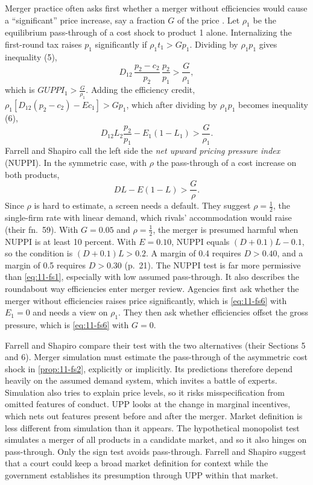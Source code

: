  Merger practice often asks first whether a merger without efficiencies would
cause a ``significant'' price increase, say a fraction $G$ of the price \citep[Section 3.C]{FarrellShapiro2010}. Let
$\rho_1$ be the equilibrium pass-through of a cost shock to product 1 alone. Internalizing the first-round tax raises
$p_1$ significantly if $\rho_1 t_1 > G p_1$. Dividing by $\rho_1 p_1$ gives inequality (5),
\begin{equation}\label{eq:11-fs5}
  D_{12}\,\frac{p_2 - c_2}{p_2}\,\frac{p_2}{p_1} > \frac{G}{\rho_1} ,
\end{equation}
which is $\mathit{GUPPI}_1 > \frac{G}{\rho_1}$. Adding the efficiency credit, $\rho_1[D_{12}(p_2 - c_2) - E c_1] > G p_1$,
which after dividing by $\rho_1 p_1$ becomes inequality (6),
\begin{equation}\label{eq:11-fs6}
  D_{12} L_2 \frac{p_2}{p_1} - E_1 (1 - L_1) > \frac{G}{\rho_1} .
\end{equation}
Farrell and Shapiro call the left side the \emph{net upward pricing pressure index} (NUPPI). In the symmetric case,
with $\rho$ the pass-through of a cost increase on both products,
\begin{equation}\label{eq:11-nuppi-sym}
  D L - E(1 - L) > \frac{G}{\rho} .
\end{equation}
Since $\rho$ is hard to estimate, a screen needs a default. They suggest $\rho = \frac{1}{2}$, the single-firm rate with
linear demand, which rivals' accommodation would raise (their fn.~59). With $G = 0.05$ and $\rho = \frac{1}{2}$, the
merger is presumed harmful when NUPPI is at least 10 percent. With $E = 0.10$, NUPPI equals $(D + 0.1)L - 0.1$, so the
condition is $(D + 0.1)L > 0.2$. A margin of 0.4 requires $D > 0.40$, and a margin of 0.5 requires $D > 0.30$
(p.~21). The NUPPI test is far more permissive than \eqref{eq:11-fs1}, especially with low assumed pass-through. It also
describes the roundabout way efficiencies enter merger review. Agencies first ask whether the merger without
efficiencies raises price significantly, which is \eqref{eq:11-fs6} with $E_1 = 0$ and needs a view on $\rho_1$. They
then ask whether efficiencies offset the gross pressure, which is \eqref{eq:11-fs6} with $G = 0$.

 Farrell and Shapiro compare their test with the two alternatives
(their Sections 5 and 6). Merger simulation must estimate the pass-through of the asymmetric cost shock in
\cref{prop:11-fs2}, explicitly or implicitly. Its predictions therefore depend heavily on the assumed demand system,
which invites a battle of experts. Simulation also tries to explain price levels, so it risks misspecification from
omitted features of conduct. UPP looks at the change in marginal incentives, which nets out features present before
and after the merger. Market definition is less different from simulation than it appears. The hypothetical monopolist
test simulates a merger of all products in a candidate market, and so it also hinges on pass-through. Only the sign
test avoids pass-through. Farrell and Shapiro suggest that a court could keep a broad market definition for context
while the government establishes its presumption through UPP within that market.

